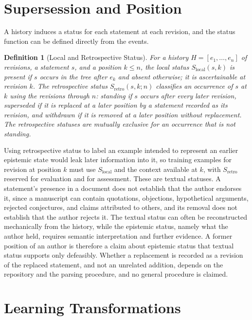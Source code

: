 \documentclass[12pt,oneside,openany]{book}
\theoremstyle{spherepop}
\newtheorem{definition}{Definition}[chapter]
\theoremstyle{remarkstyle}
\begin{document}
\section{Supersession and Position}

A history induces a status for each statement at each revision, and the status function can be defined directly from the events.

\begin{definition}[Local and Retrospective Status]
For a history $H=[e_1,\dots,e_n]$ of revisions, a statement $s$, and a position $k\le n$, the \emph{local status} $S_{\mathrm{local}}(s,k)$ is \emph{present} if $s$ occurs in the tree after $e_k$ and \emph{absent} otherwise; it is ascertainable at revision $k$. The \emph{retrospective status} $S_{\mathrm{retro}}(s,k;n)$ classifies an occurrence of $s$ at $k$ using the revisions through $n$: \emph{standing} if $s$ occurs after every later revision, \emph{superseded} if it is replaced at a later position by a statement recorded as its revision, and \emph{withdrawn} if it is removed at a later position without replacement. The retrospective statuses are mutually exclusive for an occurrence that is not standing.
\end{definition}

Using retrospective status to label an example intended to represent an earlier epistemic state would leak later information into it, so training examples for revision at position $k$ must use $S_{\mathrm{local}}$ and the context available at $k$, with $S_{\mathrm{retro}}$ reserved for evaluation and for assessment. These are textual statuses. A statement's presence in a document does not establish that the author endorses it, since a manuscript can contain quotations, objections, hypothetical arguments, rejected conjectures, and claims attributed to others, and its removal does not establish that the author rejects it. The textual status can often be reconstructed mechanically from the history, while the epistemic status, namely what the author held, requires semantic interpretation and further evidence. A former position of an author is therefore a claim about epistemic status that textual status supports only defeasibly. Whether a replacement is recorded as a revision of the replaced statement, and not an unrelated addition, depends on the repository and the parsing procedure, and no general procedure is claimed.

\section{Learning Transformations}
\end{document}
